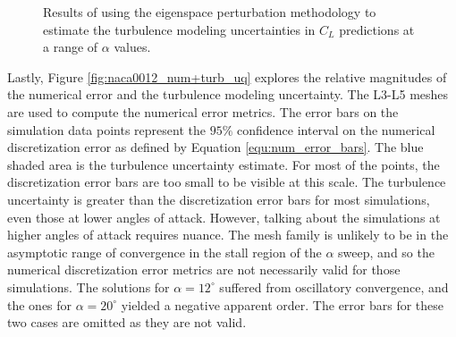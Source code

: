 \begin{figure}
\center
{}
\caption{Results of using the eigenspace perturbation methodology to estimate the turbulence modeling uncertainties in $C_L$ predictions at a range of $\alpha$ values. }\label{fig:naca0012_mesh_sweeps}
\end{figure}

Lastly, Figure \ref{fig:naca0012_num+turb_uq} explores the relative magnitudes of the numerical error and the turbulence modeling uncertainty. 
The L3-L5 meshes are used to compute the numerical error metrics. 
The error bars on the simulation data points represent the $95\%$ confidence interval on the numerical discretization error as defined by Equation \ref{equ:num_error_bars}.
The blue shaded area is the turbulence uncertainty estimate. 
For most of the points, the discretization error bars are too small to be visible at this scale.
The turbulence uncertainty is greater than the discretization error bars for most simulations, even those at lower angles of attack. 
However, talking about the simulations at higher angles of attack requires nuance. 
The mesh family is unlikely to be in the asymptotic range of convergence in the stall region of the $\alpha$ sweep, and so the numerical discretization error metrics are not necessarily valid for those simulations. 
The solutions for $\alpha = 12^\circ$ suffered from oscillatory convergence, and the ones for $\alpha = 20^\circ$ yielded a negative apparent order.
The error bars for these two cases are omitted as they are not valid.

